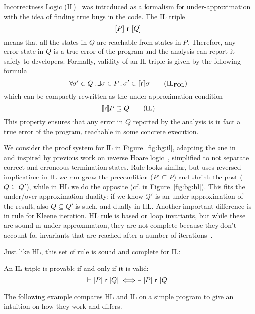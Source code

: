 Incorrectness Logic (IL)~\cite{OHearn20} was introduced as a formalism for under-approximation with the idea of finding true bugs in the code. The IL triple
\[
[P]~\mathsf{r}~[Q]
\]
means that all the states in $Q$ are reachable from states in $P$. Therefore, any error state in $Q$ is a true error of the program and the analysis can report it safely to developers.
Formally, validity of an IL triple is given by the following formula
\[
\forall \sigma' \in Q \sdot \exists \sigma \in P \sdot \sigma' \in \fwsem{\regr} \sigma \tag{IL$_{\text{FOL}}$}\label{eq:bg:il-fol}
\]
which can be compactly rewritten as the under-approximation condition
\[
\llbracket\mathsf{r}\rrbracket P \supseteq Q \tag{IL}\label{eq:bg:il-validity}
\]
This property ensures that any error in $Q$ reported by the analysis is in fact a true error of the program, reachable in some concrete execution.

We consider the proof system for IL in Figure~\ref{fig:bg:il}, adapting the one in~\cite{MOH21} and inspired by previous work on reverse Hoare logic~\cite{VK11}, simplified to not separate correct and erroneous termination states.
Rule  looks similar, but uses reversed implication: in IL we can grow the precondition ($P' \subseteq P$) and shrink the post ($Q \subseteq Q'$), while in HL we do the opposite (cf.  in Figure~\ref{fig:bg:hl}). This fits the under/over-approximation duality: if we know $Q'$ is an under-approximation of the result, also $Q \subseteq Q'$ is such, and dually in HL.
Another important difference is in rule  for Kleene iteration. HL rule  is based on loop invariants, but while these are sound in under-approximation, they are not complete because they don't account for invariants that are reached after a number of iterations~\cite[§4]{OHearn20}.

Just like HL, this set of rule is sound and complete for IL:

\begin{theorem}
	An IL triple is provable if and only if it is valid:
	\[
	\vdash[P]~\mathsf{r}~[Q] \iff \vDash[P]~\mathsf{r}~[Q]
	\]
\end{theorem}

The following example compares HL and IL on a simple program to give an intuition on how they work and differs.

